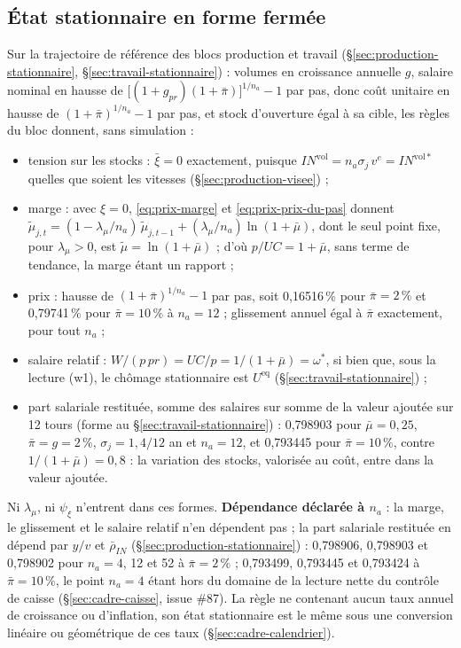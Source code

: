 \documentclass[11pt,a4paper]{article}
\begin{document}
\subsection{État stationnaire en forme fermée}
\label{sec:prix-stationnaire}
Sur la trajectoire de référence des blocs production et travail (\S\ref{sec:production-stationnaire}, \S\ref{sec:travail-stationnaire}) : volumes en croissance annuelle $g$, salaire nominal en hausse de $\bigl[(1 + g_{\mathit{pr}})(1 + \bar\pi)\bigr]^{1/n_a} - 1$ par pas, donc coût unitaire en hausse de $(1 + \bar\pi)^{1/n_a} - 1$ par pas, et stock d'ouverture égal à sa cible, les règles du bloc donnent, sans simulation :
\begin{itemize}
\item tension sur les stocks : $\bar\xi = 0$ exactement, puisque $\mathit{IN}^{\mathrm{vol}} = n_a\sigma_j\,v^e = \mathit{IN}^{\mathrm{vol}\ast}$ quelles que soient les vitesses (\S\ref{sec:production-visee}) ;
\item marge : avec $\xi = 0$, \eqref{eq:prix-marge} et \eqref{eq:prix-prix-du-pas} donnent $\tilde\mu_{j,t} = (1 - \lambda_\mu/n_a)\,\tilde\mu_{j,t-1} + (\lambda_\mu/n_a)\ln(1 + \bar\mu)$, dont le seul point fixe, pour $\lambda_\mu > 0$, est $\tilde\mu = \ln(1 + \bar\mu)$ ; d'où $p/\mathit{UC} = 1 + \bar\mu$, sans terme de tendance, la marge étant un rapport ;
\item prix : hausse de $(1 + \bar\pi)^{1/n_a} - 1$ par pas, soit 0,16516\,\% pour $\bar\pi = 2\,\%$ et 0,79741\,\% pour $\bar\pi = 10\,\%$ à $n_a = 12$ ; glissement annuel égal à $\bar\pi$ exactement, pour tout $n_a$ ;
\item salaire relatif : $W/(p\,\mathit{pr}) = \mathit{UC}/p = 1/(1 + \bar\mu) = \omega^{\ast}$, si bien que, sous la lecture (w1), le chômage stationnaire est $U^{\mathrm{eq}}$ (\S\ref{sec:travail-stationnaire}) ;
\item part salariale restituée, somme des salaires sur somme de la valeur ajoutée sur 12 tours (forme au \S\ref{sec:travail-stationnaire}) : 0,798903 pour $\bar\mu = 0{,}25$, $\bar\pi = g = 2\,\%$, $\sigma_j = 1{,}4/12$ an et $n_a = 12$, et 0,793445 pour $\bar\pi = 10\,\%$, contre $1/(1 + \bar\mu) = 0{,}8$ : la variation des stocks, valorisée au coût, entre dans la valeur ajoutée.
\end{itemize}
Ni $\lambda_\mu$, ni $\psi_\xi$ n'entrent dans ces formes. \textbf{Dépendance déclarée à $n_a$} : la marge, le glissement et le salaire relatif n'en dépendent pas ; la part salariale restituée en dépend par $y/v$ et $\bar\rho_{\mathit{IN}}$ (\S\ref{sec:production-stationnaire}) : 0,798906, 0,798903 et 0,798902 pour $n_a = 4$, 12 et 52 à $\bar\pi = 2\,\%$ ; 0,793499, 0,793445 et 0,793424 à $\bar\pi = 10\,\%$, le point $n_a = 4$ étant hors du domaine de la lecture nette du contrôle de caisse (\S\ref{sec:cadre-caisse}, issue \#87). La règle ne contenant aucun taux annuel de croissance ou d'inflation, son état stationnaire est le même sous une conversion linéaire ou géométrique de ces taux (\S\ref{sec:cadre-calendrier}).
\end{document}
